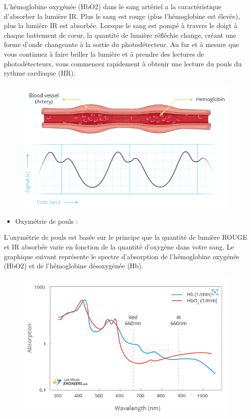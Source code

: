 \begin{flushleft}
	L’hémoglobine oxygénée (HbO2) dans le sang artériel a la caractéristique d’absorber la lumière IR. Plus le sang est rouge (plus l’hémoglobine est élevée), plus la lumière IR est absorbée. Lorsque le sang est pompé à travers le doigt à chaque battement de cœur, la quantité de lumière réfléchie change, créant une forme d’onde changeante à la sortie du photodétecteur. Au fur et à mesure que vous continuez à faire briller la lumière et à prendre des lectures de photodétecteurs, vous commencez rapidement à obtenir une lecture du pouls du rythme cardiaque (HR).
	\begin{figure}[h]
		\centering
		\includegraphics{chapitres/images/Capteur6.PNG}
		\label{fig:labelname}
	\end{figure}
	\begin{itemize}
		\item {\Large Oxymétrie de pouls :}
	\end{itemize}
	L’oxymétrie de pouls est basée sur le principe que la quantité de lumière ROUGE et IR absorbée varie en fonction de la quantité d’oxygène dans votre sang. Le graphique suivant représente le spectre d’absorption de l’hémoglobine oxygénée (HbO2) et de l’hémoglobine désoxygénée (Hb).
	\begin{figure}[h]
		\centering
		\includegraphics{chapitres/images/Capteur7.PNG}

\end{figure}
\end{flushleft}
